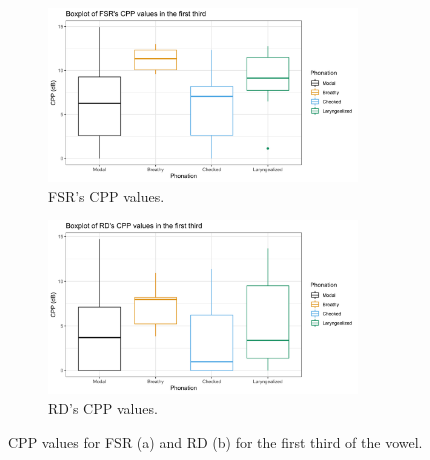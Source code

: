 \documentclass[12pt, letterpaper]{article}
\begin{document}
\begin{figure}[!ht]
	\centering
	\begin{subfigure}{.5\textwidth}
		\centering
		\includegraphics[width=0.9\textwidth]{Images/mean_FSR_cpp_First.png}
		\caption{FSR's CPP values.}
		\label{fig:FSRcppfirst} 
	\end{subfigure}%
	\begin{subfigure}{.5\textwidth}
		\centering
		\includegraphics[width=0.9\textwidth]{Images/mean_RD_cpp_First.png}
		\caption{RD's CPP values.}
		\label{fig:RDcppfirst} 
	\end{subfigure}
	\caption{CPP values for FSR (a) and RD (b) for the first third of the vowel. }
	\label{fig:cppfirst}
\end{figure}
\end{document}
